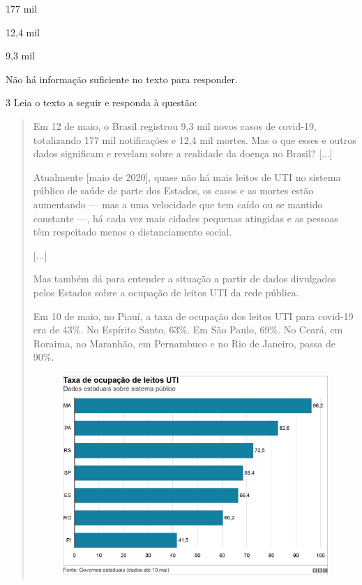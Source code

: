 \begin{escolha}
\item 177 mil

\item 12,4 mil

\item 9,3 mil

\item Não há informação suficiente no texto para responder.
\end{escolha}


\num{3} Leia o texto a seguir e responda à questão:

\begin{quote}
Em 12 de maio, o Brasil registrou 9,3 mil novos casos de covid-19,
totalizando 177 mil notificações e 12,4 mil mortes. Mas o que esses e
outros dados significam e revelam sobre a realidade da doença no Brasil?
{[}...{]}

Atualmente {[}maio de 2020{]}, quase não há mais leitos de UTI no
sistema público de saúde de parte dos Estados, os casos e as mortes
estão aumentando --- mas a uma velocidade que tem caído ou se mantido
constante ---, há cada vez mais cidades pequenas atingidas e as pessoas
têm respeitado menos o distanciamento social.

{[}...{]}

Mas também dá para entender a situação a partir de dados divulgados
pelos Estados sobre a ocupação de leitos UTI da rede pública.

Em 10 de maio, no Piauí, a taxa de ocupação dos leitos UTI para covid-19
era de 43\%. No Espírito Santo, 63\%. Em São Paulo, 69\%. No Ceará, em
Roraima, no Maranhão, em Pernambuco e no Rio de Janeiro, passa de 90\%.

\begin{figure}[htpb!]
\includegraphics[width=.5\textwidth]{./imgs/img23.png}
\end{figure}
\end{quote}

